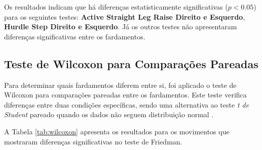         Os resultados indicam que há diferenças estatisticamente significativas ($p < 0.05$) para os seguintes testes: \textbf{Active Straight Leg Raise Direito e Esquerdo}, \textbf{Hurdle Step Direito e Esquerdo}. Já os outros testes não apresentaram diferenças significativas entre os fardamentos.

    \subsection{Teste de Wilcoxon para Comparações Pareadas}
        Para determinar quais fardamentos diferem entre si, foi aplicado o teste de Wilcoxon para comparações pareadas entre os fardamentos. Este teste verifica diferenças entre duas condições específicas, sendo uma alternativa ao teste \textit{t de Student} pareado quando os dados não seguem distribuição normal \cite{hilton1996appropriateness}.

        A Tabela \ref{tab:wilcoxon} apresenta os resultados para os movimentos que mostraram diferenças significativas no teste de Friedman.

